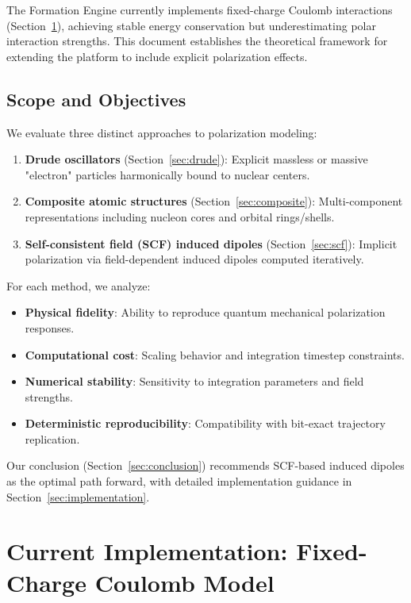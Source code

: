 \documentclass[11pt,letterpaper]{article}
\begin{document}
The Formation Engine currently implements fixed-charge Coulomb interactions (Section~\ref{sec:current}), achieving stable energy conservation but underestimating polar interaction strengths. This document establishes the theoretical framework for extending the platform to include explicit polarization effects.

\subsection{Scope and Objectives}

We evaluate three distinct approaches to polarization modeling:

\begin{enumerate}
    \item \textbf{Drude oscillators} (Section~\ref{sec:drude}): Explicit massless or massive "electron" particles harmonically bound to nuclear centers.
    \item \textbf{Composite atomic structures} (Section~\ref{sec:composite}): Multi-component representations including nucleon cores and orbital rings/shells.
    \item \textbf{Self-consistent field (SCF) induced dipoles} (Section~\ref{sec:scf}): Implicit polarization via field-dependent induced dipoles computed iteratively.
\end{enumerate}

For each method, we analyze:
\begin{itemize}
    \item \textbf{Physical fidelity}: Ability to reproduce quantum mechanical polarization responses.
    \item \textbf{Computational cost}: Scaling behavior and integration timestep constraints.
    \item \textbf{Numerical stability}: Sensitivity to integration parameters and field strengths.
    \item \textbf{Deterministic reproducibility}: Compatibility with bit-exact trajectory replication.
\end{itemize}

Our conclusion (Section~\ref{sec:conclusion}) recommends SCF-based induced dipoles as the optimal path forward, with detailed implementation guidance in Section~\ref{sec:implementation}.

\section{Current Implementation: Fixed-Charge Coulomb Model}
\label{sec:current}
\end{document}
